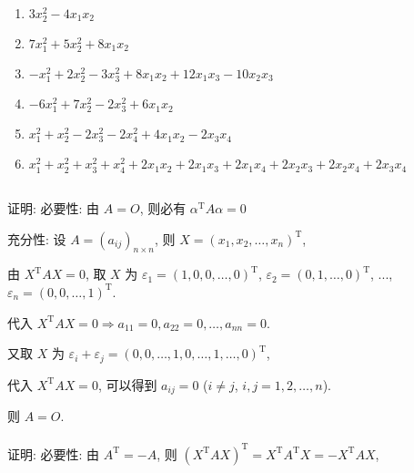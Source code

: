 	 \paragraph{} %
		 \begin{enumerate}
			 \item %
			       \( 3x_{2}^{2} - 4x_{1}x_{2} \)
			 \item %
			       \( 7x_{1}^{2} + 5x_{2}^{2} + 8x_{1}x_{2} \)
			 \item %
			       \( -x_{1}^{2} + 2x_{2}^{2} - 3x_{3}^{2} + 8x_{1}x_{2} + 12x_{1}x_{3} - 10x_{2}x_{3} \)
			 \item %
			       \( -6x_{1}^{2} + 7x_{2}^{2} - 2x_{3}^{2} + 6x_{1}x_{2} \)
			 \item %
			       \( x_{1}^{2} + x_{2}^{2} - 2x_{3}^{2} - 2x_{4}^{2} + 4x_{1}x_{2} - 2x_{3}x_{4} \)
			 \item %
			       \( x_{1}^{2} + x_{2}^{2} + x_{3}^{2} + x_{4}^{2} + 2x_{1}x_{2} + 2x_{1}x_{3} + 2x_{1}x_{4} + 2x_{2}x_{3} + 2x_{2}x_{4} + 2x_{3}x_{4} \)
		 \end{enumerate}


 \subsection{} %


	 \paragraph{} %
		 证明: 必要性: 由 \( A = O \), 则必有 \( \alpha^{\mathrm{T}}A\alpha = 0 \)

		 充分性: 设 \( A = (a_{ij})_{n \times n} \), 则 \( X = (x_{1}, x_{2}, \dots, x_{n})^{\mathrm{T}} \),

		 由 \( X^{\mathrm{T}}AX = 0 \), 取 \( X \) 为 \( \varepsilon_{1} = (1, 0, 0, \dots, 0)^{\mathrm{T}} \), \( \varepsilon_{2} = (0, 1, \dots, 0)^{\mathrm{T}} \), ..., \( \varepsilon_{n} = (0, 0, \dots, 1)^{\mathrm{T}} \).

		 代入 \( X^{\mathrm{T}}AX = 0 \Rightarrow a_{11} = 0, a_{22} = 0, \dots, a_{nn} = 0 \).

		 又取 \( X \) 为 \( \varepsilon_{i} + \varepsilon_{j} = (0, 0, \dots, 1, 0, \dots, 1, \dots, 0)^{\mathrm{T}} \),

		 代入 \( X^{\mathrm{T}}AX = 0 \), 可以得到 \( a_{ij} = 0 \) (\( i \neq j \), \( i, j = 1, 2, \dots, n \)).

		 则 \( A = O \).


	 \paragraph{} %
		 证明: 必要性: 由 \( A^{\mathrm{T}} = -A \), 则 \( (X^{\mathrm{T}}AX)^{\mathrm{T}} = X^{\mathrm{T}}A^{\mathrm{T}}X = -X^{\mathrm{T}}AX \),

